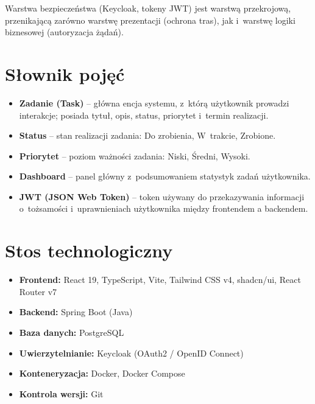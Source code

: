 \documentclass[12pt, a4paper, oneside]{article}
\begin{document}
Warstwa bezpieczeństwa (Keycloak, tokeny JWT) jest warstwą przekrojową, przenikającą zarówno warstwę prezentacji (ochrona tras), jak i~warstwę logiki biznesowej (autoryzacja żądań).

\section{Słownik pojęć}

\begin{itemize}
  \item \textbf{Zadanie (Task)} -- główna encja systemu, z~którą użytkownik prowadzi interakcje; posiada tytuł, opis, status, priorytet i~termin realizacji.
  \item \textbf{Status} -- stan realizacji zadania: Do zrobienia, W~trakcie, Zrobione.
  \item \textbf{Priorytet} -- poziom ważności zadania: Niski, Średni, Wysoki.
  \item \textbf{Dashboard} -- panel główny z~podsumowaniem statystyk zadań użytkownika.
  \item \textbf{JWT (JSON Web Token)} -- token używany do przekazywania informacji o~tożsamości i~uprawnieniach użytkownika między frontendem a backendem.
\end{itemize}

\section{Stos technologiczny}

\begin{itemize}
  \item \textbf{Frontend:} React 19, TypeScript, Vite, Tailwind CSS v4, shadcn/ui, React Router v7
  \item \textbf{Backend:} Spring Boot (Java)
  \item \textbf{Baza danych:} PostgreSQL
  \item \textbf{Uwierzytelnianie:} Keycloak (OAuth2 / OpenID Connect)
  \item \textbf{Konteneryzacja:} Docker, Docker Compose
  \item \textbf{Kontrola wersji:} Git
\end{itemize}
\end{document}
